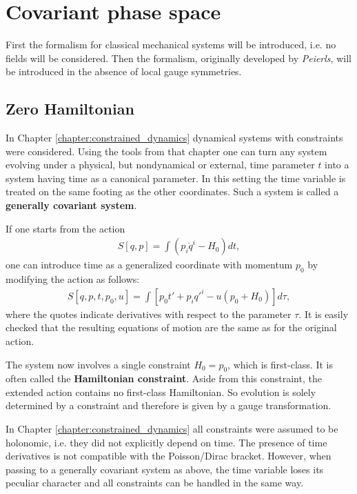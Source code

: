 \section{Covariant phase space}

    First the formalism for classical mechanical systems will be introduced, i.e. no fields will be considered. Then the formalism, originally developed by \textit{Peierls}, will be introduced in the absence of local gauge symmetries.

\subsection{Zero Hamiltonian}

    In Chapter \ref{chapter:constrained_dynamics} dynamical systems with constraints were considered. Using the tools from that chapter one can turn any system evolving under a physical, but nondynamical or external, time parameter $t$ into a system having time as a canonical parameter. In this setting the time variable is treated on the same footing as the other coordinates. Such a system is called a \textbf{generally covariant system}.

    If one starts from the action
    \begin{gather}
        S[q,p] = \int \left(p_i\dot{q}^i-H_0\right)dt,
    \end{gather}
    one can introduce time as a generalized coordinate with momentum $p_0$ by modifying the action as follows:
    \begin{gather}
        S[q,p,t,p_0,u] = \int \left[p_0t'+p_iq'^i-u(p_0+H_0)\right]d\tau,
    \end{gather}
    where the quotes indicate derivatives with respect to the parameter $\tau$. It is easily checked that the resulting equations of motion are the same as for the original action.

    The system now involves a single constraint $H_0=p_0$, which is first-class. It is often called the \textbf{Hamiltonian constraint}. Aside from this constraint, the extended action contains no first-class Hamiltonian. So evolution is solely determined by a constraint and therefore is given by a gauge transformation.

    \begin{remark}
        In Chapter \ref{chapter:constrained_dynamics} all constraints were assumed to be holonomic, i.e. they did not explicitly depend on time. The presence of time derivatives is not compatible with the Poisson/Dirac bracket. However, when passing to a generally covariant system as above, the time variable loses its peculiar character and all constraints can be handled in the same way.
    \end{remark}


